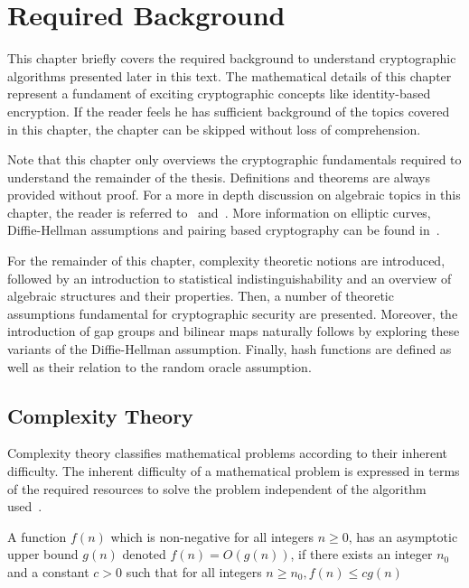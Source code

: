 \chapter{Required Background}
\label{cha:1}
This chapter briefly covers the required background to understand cryptographic algorithms presented later in this text. The mathematical details of this chapter represent a fundament of exciting cryptographic concepts like identity-based encryption. If the reader feels he has sufficient background of the topics covered in this chapter, the chapter can be skipped without loss of comprehension.

Note that this chapter only overviews the cryptographic fundamentals required to understand the remainder of the thesis. Definitions and theorems are always provided without proof. For a more in depth discussion on algebraic topics in this chapter, the reader is referred to~\cite{book:handbook_of_applied_cryptography} and~\cite{book:survey_of_modern_algebra}. More information on elliptic curves, Diffie-Hellman assumptions and pairing based cryptography can be found in~\cite{thesis:Maas04}.

For the remainder of this chapter, complexity theoretic notions are introduced, followed by an introduction to statistical indistinguishability and an overview of algebraic structures and their properties. Then, a number of theoretic assumptions fundamental for cryptographic security are presented. Moreover, the introduction of gap groups and bilinear maps naturally follows by exploring these variants of the Diffie-Hellman assumption. Finally, hash functions are defined as well as their relation to the random oracle assumption.

\section{Complexity Theory}
Complexity theory classifies mathematical problems according to their inherent difficulty. The inherent difficulty of a mathematical problem is expressed in terms of the required resources to solve the problem independent of the algorithm used~\cite{book:handbook_of_applied_cryptography}.

\begin{defn}
\label{def:asymptotic_upper_bound}
 A function $f \left( n \right)$ which is non-negative for all integers $n \geq 0$, has an asymptotic upper bound $g \left( n \right)$ denoted $f \left( n \right) = O \left( g \left( n \right) \right)$, if there exists an integer $n_0$ and a constant $c > 0$ such that for all integers $n \geq n_0, f \left( n \right) \leq c g \left( n \right)$
\end{defn}

